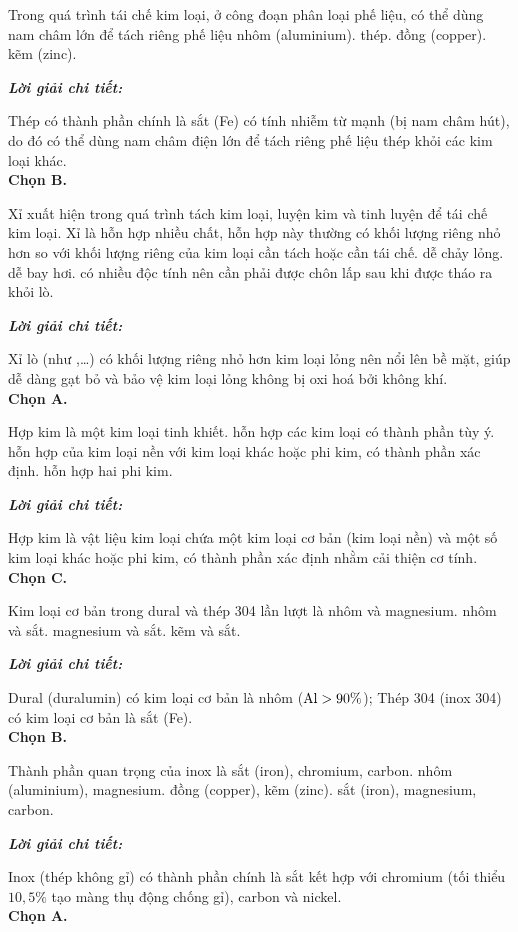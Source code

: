\documentclass[11pt,a4paper]{article}
\def\loigiai#1{
\par\begingroup\color{blue!80!black}\small
\noindent\textbf{\textit{Lời giải chi tiết:}}\par
#1\par\endgroup}
\begin{document}
\begin{ex}
Trong quá trình tái chế kim loại, ở công đoạn phân loại phế liệu, có thể dùng nam châm lớn để tách riêng phế liệu
\choice
{nhôm (aluminium).}
{\True thép.}
{đồng (copper).}
{kẽm (zinc).}
\loigiai{
Thép có thành phần chính là sắt (Fe) có tính nhiễm từ mạnh (bị nam châm hút), do đó có thể dùng nam châm điện lớn để tách riêng phế liệu thép khỏi các kim loại khác.\\
\textbf{Chọn B.}}
\end{ex}

\begin{ex}
Xỉ xuất hiện trong quá trình tách kim loại, luyện kim và tinh luyện để tái chế kim loại. Xỉ là hỗn hợp nhiều chất, hỗn hợp này thường
\choice
{\True có khối lượng riêng nhỏ hơn so với khối lượng riêng của kim loại cần tách hoặc cần tái chế.}
{dễ chảy lỏng.}
{dễ bay hơi.}
{có nhiều độc tính nên cần phải được chôn lấp sau khi được tháo ra khỏi lò.}
\loigiai{
Xỉ lò (như ,\dots) có khối lượng riêng nhỏ hơn kim loại lỏng nên nổi lên bề mặt, giúp dễ dàng gạt bỏ và bảo vệ kim loại lỏng không bị oxi hoá bởi không khí.\\
\textbf{Chọn A.}}
\end{ex}

\begin{ex}
Hợp kim là
\choice
{một kim loại tinh khiết.}
{hỗn hợp các kim loại có thành phần tùy ý.}
{\True hỗn hợp của kim loại nền với kim loại khác hoặc phi kim, có thành phần xác định.}
{hỗn hợp hai phi kim.}
\loigiai{
Hợp kim là vật liệu kim loại chứa một kim loại cơ bản (kim loại nền) và một số kim loại khác hoặc phi kim, có thành phần xác định nhằm cải thiện cơ tính.\\
\textbf{Chọn C.}}
\end{ex}



\begin{ex}
Kim loại cơ bản trong dural và thép 304 lần lượt là
\choice
{nhôm và magnesium.}
{\True nhôm và sắt.}
{magnesium và sắt.}
{kẽm và sắt.}
\loigiai{
Dural (duralumin) có kim loại cơ bản là nhôm ($\ce{Al} > 90\%$); Thép 304 (inox 304) có kim loại cơ bản là sắt (Fe).\\
\textbf{Chọn B.}}
\end{ex}

\begin{ex}
Thành phần quan trọng của inox là
\choice
{\True sắt (iron), chromium, carbon.}
{nhôm (aluminium), magnesium.}
{đồng (copper), kẽm (zinc).}
{sắt (iron), magnesium, carbon.}
\loigiai{
Inox (thép không gỉ) có thành phần chính là sắt kết hợp với chromium (tối thiểu $10{,}5\%$ tạo màng thụ động chống gỉ), carbon và nickel.\\
\textbf{Chọn A.}}
\end{ex}
\end{document}
